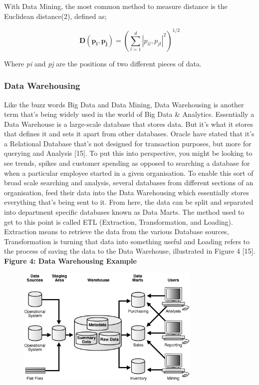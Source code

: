 \documentclass[10pt,journal,compsoc]{IEEEtran}
\begin{document}
With Data Mining, the most common method to measure distance is the Euclidean distance(2), defined as;

\begin{equation}
\mathbf{D(p_{i}, p_{j})} = 
\left(
\sum_{l=1}^{d} |p_{il}, p_{jl}|^2
\right)^{1/2}
\end{equation}

Where \textit{pi} and \textit{pj} are the positions of two different pieces of data.

\subsubsection{Data Warehousing}
Like the buzz words Big Data and Data Mining, Data Warehousing is another term that's being widely used in the world of Big Data \& Analytics. Essentially a Data Warehouse is a large-scale database that stores data. But it's what it stores that defines it and sets it apart from other databases. Oracle have stated that it's a Relational Database that's not designed for transaction purposes, but more for querying and Analysis [15]. To put this into perspective, you might be looking to see trends, spikes and customer spending as opposed to searching a database for when a particular employee started in a given organisation. To enable this sort of broad scale searching and analysis, several databases from different sections of an organisation, feed their data into the Data Warehousing which essentially stores everything that's being sent to it. From here, the data can be split and separated into department specific databases known as Data Marts. The method used to get to this point is called ETL (Extraction, Transformation, and Loading). Extraction means to retrieve the data from the various Database sources, Transformation is turning that data into something useful and Loading refers to the process of saving the data to the Data Warehouse, illustrated in Figure 4 [15].\\

\textbf{Figure 4: Data Warehousing Example}
\begin{figure}[ht!]
	\centering
	\includegraphics[width=88mm]{dwarehouse.jpg}
\end{figure}
\end{document}

